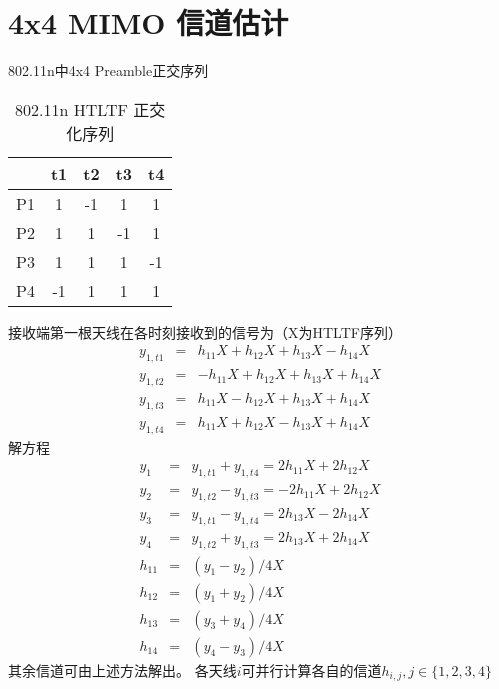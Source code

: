 
\section{4x4 MIMO 信道估计}
802.11n中4x4 Preamble正交序列
\begin{table}[tbh]
\centering
\begin{tabular}{c|c|c|c|c}
\hline
 & t1 & t2 & t3 & t4 \\
\hline
P1 & 1  & -1 & 1 & 1 \\
P2 & 1  & 1 & -1 & 1 \\
P3 & 1  & 1 & 1 & -1 \\
P4 & -1  & 1 & 1 & 1 \\
\hline
\end{tabular}
\caption{802.11n HTLTF 正交化序列}
\label{tab:dot11nHTLTFOtho}
\end{table}

接收端第一根天线在各时刻接收到的信号为（X为HTLTF序列）
\begin{eqnarray}
y_{1, t1} & = & h_{11}X + h_{12}X + h_{13}X - h_{14}X \\
y_{1, t2} & = & -h_{11}X + h_{12}X + h_{13}X + h_{14}X \\
y_{1, t3} & = & h_{11}X - h_{12}X + h_{13}X + h_{14}X \\
y_{1, t4} & = & h_{11}X + h_{12}X - h_{13}X + h_{14}X
\end{eqnarray}
解方程
\begin{eqnarray}
y_{1} & = & y_{1, t1} + y_{1, t4} = 2h_{11}X  + 2h_{12}X  \\
y_{2} & = & y_{1, t2} -  y_{1, t3} = -2h_{11}X  + 2h_{12}X   \\
y_{3} & = & y_{1, t1} - y_{1, t4} = 2h_{13}X  - 2h_{14}X  \\
y_{4} & = & y_{1, t2} + y_{1, t3} = 2h_{13}X  + 2h_{14}X  \\
h_{11} & = & (y_{1} - y_{2}) / 4X \\
h_{12} & = & (y_{1} + y_{2}) / 4X \\
h_{13} & = & (y_{3} + y_{4}) / 4X  \\
h_{14} & = & (y_{4} - y_{3}) / 4X
\end{eqnarray}
其余信道可由上述方法解出。
各天线$i$可并行计算各自的信道$h_{i, j}, j \in \{1, 2, 3, 4\}$